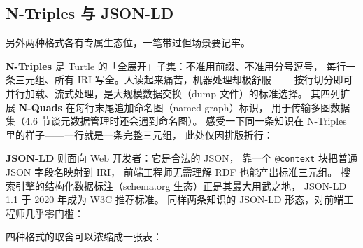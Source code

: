\subsection{N-Triples 与 JSON-LD}

另外两种格式各有专属生态位，一笔带过但场景要记牢。

\textbf{N-Triples} 是 Turtle 的「全展开」子集：不准用前缀、不准用分号逗号，
每行一条三元组、所有 IRI 写全。人读起来痛苦，机器处理却极舒服——
按行切分即可并行加载、流式处理，是大规模数据交换（dump 文件）的标准选择。
其四列扩展 \textbf{N-Quads} 在每行末尾追加命名图（named graph）标识，
用于传输多图数据集（4.6 节谈元数据管理时还会遇到命名图）。
感受一下同一条知识在 N-Triples 里的样子——一行就是一条完整三元组，
此处仅因排版折行：

\begin{codebox}
\end{codebox}

\textbf{JSON-LD} 则面向 Web 开发者：它是合法的 JSON，
靠一个 \texttt{@context} 块把普通 JSON 字段名映射到 IRI，
前端工程师无需理解 RDF 也能产出标准三元组。
搜索引擎的结构化数据标注（schema.org 生态）正是其最大用武之地，
JSON-LD 1.1 于 2020 年成为 W3C 推荐标准。
同样两条知识的 JSON-LD 形态，对前端工程师几乎零门槛：

\begin{codebox}
\codeline{\{}
\codeline{\}}
\end{codebox}

四种格式的取舍可以浓缩成一张表：


